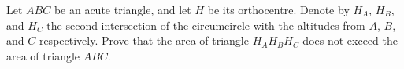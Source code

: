 Let $ABC$ be an acute triangle, and let $H$ be its orthocentre.  Denote by $H_A$,  $H_B$,  and $H_C$ the second intersection of the circumcircle with the altitudes from $A$,  $B$,  and $C$ respectively.  Prove that the area of triangle $H_A H_B H_C$ does not exceed the area of triangle $ABC$.